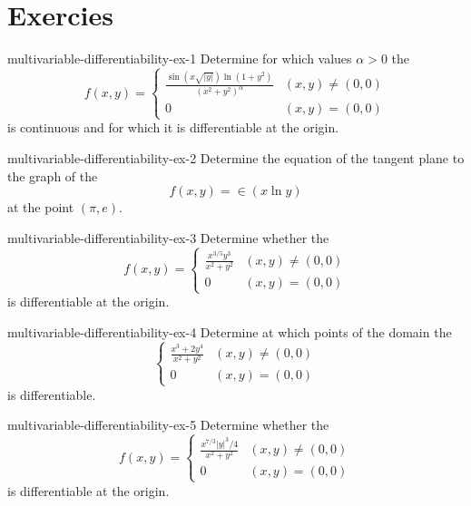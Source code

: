 \documentclass[preview]{standalone}
\begin{document}
\genpage

\section{Exercies}

\begin{snippetexercise}{multivariable-differentiability-ex-1}{}
    Determine for which values \(\alpha > 0\) the \function
    \[
        f(x,y) = \begin{cases}
            \frac{\sin\left(x\sqrt{|y|}\right) \ln(1 + y^2)}{{(x^2 + y^2)}^\alpha} & (x,y) \neq (0,0) \\
            0 & (x,y) = (0,0)
        \end{cases}
    \]
    is continuous and for which it is differentiable at the origin.
\end{snippetexercise}

\begin{snippetexercise}{multivariable-differentiability-ex-2}{}
    Determine the equation of the tangent plane
    to the graph of the \function
    \[ f(x,y) = \in(x\ln y) \]
    at the point \((\pi, e)\).
\end{snippetexercise}

\begin{snippetexercise}{multivariable-differentiability-ex-3}{}
    Determine whether the \function
    \[
        f(x,y) = \begin{cases}
            \frac{x^{3/5}y^3}{x^2 + y^2} & (x,y) \neq (0,0) \\
            0 & (x,y) = (0,0)
        \end{cases}
    \]
    is differentiable at the origin.
\end{snippetexercise}

\begin{snippetexercise}{multivariable-differentiability-ex-4}{}
    Determine at which points of the domain the \function
    \[
        \begin{cases}
            \frac{x^3 + 2y^4}{x^2 + y^2} & (x,y) \neq (0,0) \\
            0 & (x,y) = (0,0)
        \end{cases}
    \]
    is differentiable.
\end{snippetexercise}

\begin{snippetexercise}{multivariable-differentiability-ex-5}{}
    Determine whether the \function
    \[
        f(x,y) = \begin{cases}
            \frac{x^{7/3}{|y|}^3/4}{x^2 + y^2} & (x,y) \neq (0,0) \\
            0 & (x,y) = (0,0)
        \end{cases}
    \]
    is differentiable at the origin.
\end{snippetexercise}
\end{document}
